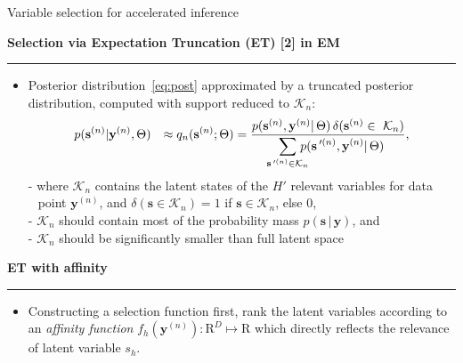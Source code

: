 \documentclass[final]{beamer}
\renewcommand{\vec}[1]{{\mathbf{#1}}}
\newcommand{\highlight}[1]{\textcolor{blocktbgn}{#1}}
\newcommand{\subhead}[1]{ \centering \textbf{#1}                                                                                                                                                                 \vskip-1.7\baselineskip~\\
\rule{\linewidth}{1pt}
\vspace{-0.9cm}
}
\newcommand{\disS}{\displaystyle}
\newcommand{\prob}[2]{p(#1 \, | \, #2)}  %
\newcommand{\Prime}{\,'}  %
\renewcommand{\vec}[1]{{\mathbf{#1}}}
\newcommand{\Kn}{\mathcal{K}_{n}}
\begin{document}
\begin{frame}{}
\begin{columns}[t]
\begin{column}{.33\linewidth}
\begin{block}{Variable selection for accelerated inference}
\begin{itemize}
\end{itemize}

        \subhead{Selection via Expectation Truncation (ET) [2] in EM}
           \begin{itemize}
            \setlength{\labelsep}{0.5em}
            \item \highlight{Posterior distribution~\eqref{eq:post}} approximated by a truncated posterior distribution, computed with \highlight{support reduced to $\Kn$}:
                \vspace{-.1cm}
                \normalsize
                \begin{align}
                \label{eq:sel-post}
                p(&\vec{s}^{(n)}|\vec{y}^{(n)},\Theta) 
                &\approx q_n(\vec{s}^{(n)};\Theta) = \frac{p(\vec{s}^{(n)},\vec{y}^{(n)}|\,\Theta) \,\delta(\vec{s}^{(n)}\in\,\,\Kn)}
                {\disS\hspace{-1.5mm}\sum_{\vec{s}\Prime^{(n)}\in\mathcal{K}_n}\hspace{-3mm} p(\vec{s}\Prime^{(n)},\vec{y}^{(n)}|\,\Theta)},
                \end{align}
                \large
                \highlight{-} where $\Kn$ contains the latent states of the $H'$ relevant variables for data \\
                $\:\:$ point $\vec{y}^{(n)}$, and $\delta(\vec{s}\in\mathcal{K}_n)=1$ if
                $\vec{s}\in\mathcal{K}_n$, else $0$, \\
                \highlight{- $\Kn$} should contain \highlight{most of the probability mass} $\prob{\vec{s}}{\vec{y}}$, and\\
                \highlight{- $\Kn$} should be significantly \highlight{smaller than full latent space}
           \end{itemize}

         
        \subhead{ET with affinity}
          \vspace{-.2cm}
           \begin{itemize}
            \setlength{\labelsep}{0.5em}

            \item \highlight{Constructing a selection function} %
first, rank the latent variables according to an 
\highlight{\emph{affinity function}} $f_h(\vec{y}^{(n)}) : \mathrm{R}^D \mapsto \mathrm{R}$ %
which directly reflects the \highlight{relevance of latent variable $s_h$}. 


\end{itemize}
\end{block}
\end{column}
\end{columns}
\end{frame}
\end{document}
